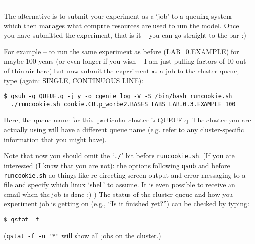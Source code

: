 \vspace{1mm}\noindent\rule{4cm}{0.1mm}\vspace{2mm}

\noindent The alternative is to submit your experiment as a ‘job’ to a queuing system which then manages what compute resources are used to run the model. Once you have submitted the experiment, that is it – you can go straight to the bar :)

For example -- to run the same experiment as before (\textsf{\footnotesize LAB\_0.EXAMPLE}) for maybe 100 years (or even longer if you wish – I am just pulling factors of 10 out of thin air here) but now submit the experiment as a job to the cluster queue, type (again: SINGLE, CONTINUOUS LINE):
\vspace{-1mm}
\small\begin{verbatim}
$ qsub -q QUEUE.q -j y -o cgenie_log -V -S /bin/bash runcookie.sh
  ./runcookie.sh cookie.CB.p_worbe2.BASES LABS LAB.0.3.EXAMPLE 100
\end{verbatim}\normalsize
\vspace{-1mm}

Here, the queue name for this\ particular cluster is \textsf{\footnotesize QUEUE.q}. \uline{The cluster you are actually using will have a different queue name} (e.g. refer to any cluster-specific information that you might have).

\vspace{1mm}
Note that now you should omit the ‘\texttt{./}’ bit before \texttt{runcookie.sh}.
(If you are interested (I know that you are not): the options following \texttt{qsub} and before \texttt{runcookie.sh} do things like re-directing screen output and error messaging to a file and specify which linux ‘shell’ to assume. It is even possible to receive an email when the job is done :) )
The status of the cluster queue and how you experiment job is getting on (e.g., “Is it finished yet?”) can be checked by typing:
\vspace{-1mm}
\small\begin{verbatim}
$ qstat -f
\end{verbatim}\normalsize
\vspace{-1mm}
(\texttt{qstat -f -u "*"} will show all jobs on the cluster.)

